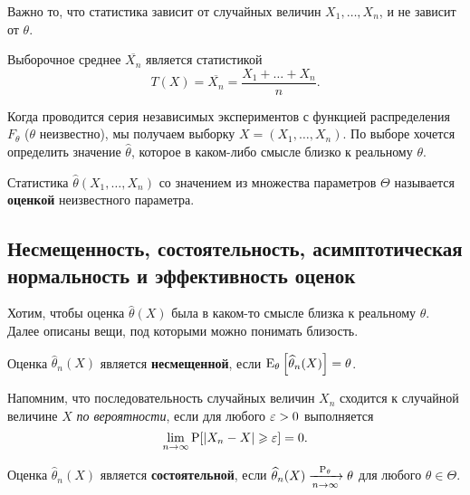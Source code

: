 Важно то, что статистика зависит от случайных величин $X_1, \dots, X_n$, и не зависит от $\theta$.

\begin{example}
    Выборочное среднее $\overline{X_n}$ является статистикой
    \begin{equation*}
        T(X) = \overline{X_n} = \dfrac{X_1 + \dots + X_n}{n}.
    \end{equation*}
\end{example}

Когда проводится серия независимых экспериментов с функцией распределения $F_{\theta}$ ($\theta$ неизвестно), мы получаем выборку $X = (X_1, \dots, X_n)$. По выборе хочется определить значение $\widehat{\theta}$, которое в каком-либо смысле близко к реальному $\theta$.

\begin{definition*}
    Статистика $\widehat{\theta}(X_1, \dots, X_n)$ со значением из множества параметров $\Theta$ называется \textbf{оценкой} неизвестного параметра.
\end{definition*}

\subsection{Несмещенность, состоятельность, асимптотическая нормальность и эффективность оценок}

Хотим, чтобы оценка $\widehat{\theta}(X)$ была в каком-то смысле близка к реальному $\theta$. Далее описаны вещи, под которыми можно понимать близость.

\begin{definition*}
    Оценка $\widehat{\theta}_n(X)$ является \textbf{несмещенной}, если $\E_{\theta} \left[\widehat{\theta}_n(X)\right] = \theta$.
\end{definition*}

Напомним, что последовательность случайных величин $X_n$ сходится к случайной величине $X$ \textit{по вероятности}, если для любого $\eps > 0$ выполняется
\begin{equation*}
    \lim_{n \to \infty} \P[|X_n - X| \geq \eps] = 0.
\end{equation*}

\begin{definition*}
    Оценка $\widehat{\theta}_n(X)$ является \textbf{состоятельной}, если $\widehat{\theta}_n(X) \xrightarrow[n \to \infty]{\P_{\theta}} \theta$ для любого $\theta \in \Theta$.
\end{definition*}

